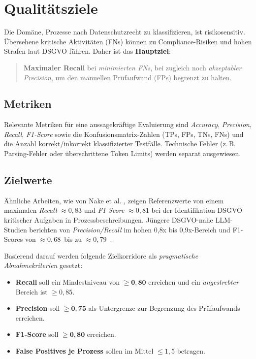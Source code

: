 \section{Qualitätsziele}\label{sec:qualitatsziele}

Die Domäne, Prozesse nach Datenschutzrecht zu klassifizieren, ist risikosensitiv. Übersehene kritische Aktivitäten (\acp{FN}) können zu Compliance-Risiken und hohen Strafen laut \ac{DSGVO} führen. Daher ist das \textbf{Hauptziel}:

\begin{quote}
    \textbf{Maximaler Recall} bei \emph{minimierten \acp{FN}}, bei zugleich noch \emph{akzeptabler Precision}, um den manuellen Prüfaufwand (\acp{FP}) begrenzt zu halten.
\end{quote}

\subsection*{Metriken}

Relevante Metriken für eine aussagekräftige Evaluierung sind \emph{Accuracy}, \emph{Precision}, \emph{Recall}, \emph{F1-Score} sowie die Konfusionsmatrix-Zahlen (\acp{TP}, \acp{FP}, \acp{TN}, \acp{FN}) und die Anzahl korrekt/inkorrekt klassifizierter Testfälle. Technische Fehler (z.\,B. Parsing-Fehler oder überschrittene Token Limits) werden separat ausgewiesen.

\subsection*{Zielwerte}

Ähnliche Arbeiten, wie von Nake et al. \cite{nake2023towards}, zeigen Referenzwerte von einem maximalen \emph{Recall} $\approx 0{,}83$ und \emph{F1-Score} $\approx 0{,}81$ bei der Identifikation \ac{DSGVO}-kritischer Aufgaben in Prozessbeschreibungen. Jüngere \ac{DSGVO}-nahe \ac{LLM}-Studien berichten von \emph{Precision/Recall} im hohen 0{,}8x bis 0{,}9x-Bereich \cite{hooda2024policylr} und F1-Scores von $\approx 0{,}68$~bis zu $\approx 0{,}79$~\cite{schwerin2024systematic}.

Basierend darauf werden folgende Zielkorridore als \emph{pragmatische Abnahmekriterien} gesetzt:

\begin{itemize}
    \item \textbf{Recall} soll ein Mindestniveau von $\mathbf{\geq 0{,}80}$ erreichen und ein \emph{angestrebter} Bereich ist $\geq 0{,}85$.
    \item \textbf{Precision} soll $\mathbf{\geq 0{,}75}$ als Untergrenze zur Begrenzung des Prüfaufwands erreichen.
    \item \textbf{F1-Score} soll $\mathbf{\geq 0{,}80}$  erreichen.
    \item \textbf{False Positives je Prozess} sollen im Mittel \textbf{$\leq 1{,}5$} betragen.
\end{itemize}

